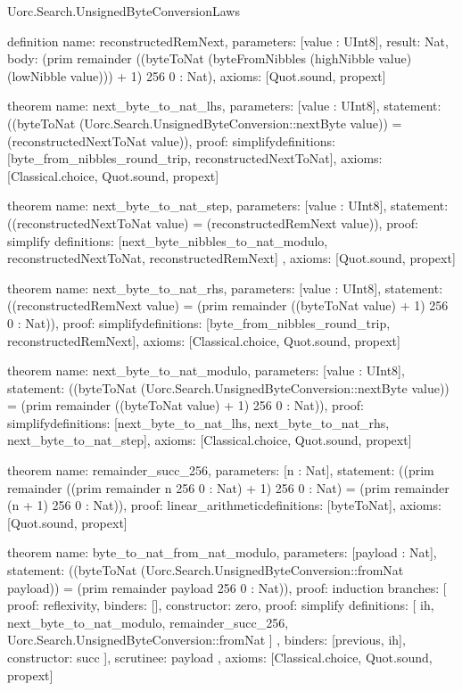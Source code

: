 \begin{lexlean}{Uorc.Search.UnsignedByteConversionLaws}
\begin{semanticmodule}
definition{
  name: reconstructedRemNext,
  parameters: [value : UInt8],
  result: Nat,
  body: (prim remainder ((byteToNat (byteFromNibbles (highNibble value) (lowNibble value))) + 1) 256 0 : Nat),
  axioms: [Quot.sound, propext]
}

theorem{
  name: next_byte_to_nat_lhs,
  parameters: [value : UInt8],
  statement: ((byteToNat (Uorc.Search.UnsignedByteConversion::nextByte value)) = (reconstructedNextToNat value)),
  proof: simplify{definitions: [byte_from_nibbles_round_trip, reconstructedNextToNat]},
  axioms: [Classical.choice, Quot.sound, propext]
}

theorem{
  name: next_byte_to_nat_step,
  parameters: [value : UInt8],
  statement: ((reconstructedNextToNat value) = (reconstructedRemNext value)),
  proof: simplify{
    definitions: [next_byte_nibbles_to_nat_modulo, reconstructedNextToNat, reconstructedRemNext]
  },
  axioms: [Quot.sound, propext]
}

theorem{
  name: next_byte_to_nat_rhs,
  parameters: [value : UInt8],
  statement: ((reconstructedRemNext value) = (prim remainder ((byteToNat value) + 1) 256 0 : Nat)),
  proof: simplify{definitions: [byte_from_nibbles_round_trip, reconstructedRemNext]},
  axioms: [Classical.choice, Quot.sound, propext]
}

theorem{
  name: next_byte_to_nat_modulo,
  parameters: [value : UInt8],
  statement: ((byteToNat (Uorc.Search.UnsignedByteConversion::nextByte value)) = (prim remainder ((byteToNat value) + 1) 256 0 : Nat)),
  proof: simplify{definitions: [next_byte_to_nat_lhs, next_byte_to_nat_rhs, next_byte_to_nat_step]},
  axioms: [Classical.choice, Quot.sound, propext]
}

theorem{
  name: remainder_succ_256,
  parameters: [n : Nat],
  statement: ((prim remainder ((prim remainder n 256 0 : Nat) + 1) 256 0 : Nat) = (prim remainder (n + 1) 256 0 : Nat)),
  proof: linear_arithmetic{definitions: [byteToNat]},
  axioms: [Quot.sound, propext]
}

theorem{
  name: byte_to_nat_from_nat_modulo,
  parameters: [payload : Nat],
  statement: ((byteToNat (Uorc.Search.UnsignedByteConversion::fromNat payload)) = (prim remainder payload 256 0 : Nat)),
  proof: induction{
    branches: [
      {proof: reflexivity{}, binders: [], constructor: zero},
      {
        proof: simplify{
          definitions: [
            ih,
            next_byte_to_nat_modulo,
            remainder_succ_256,
            Uorc.Search.UnsignedByteConversion::fromNat
          ]
        },
        binders: [previous, ih],
        constructor: succ
      }
    ],
    scrutinee: payload
  },
  axioms: [Classical.choice, Quot.sound, propext]
}


\end{semanticmodule}
\end{lexlean}

